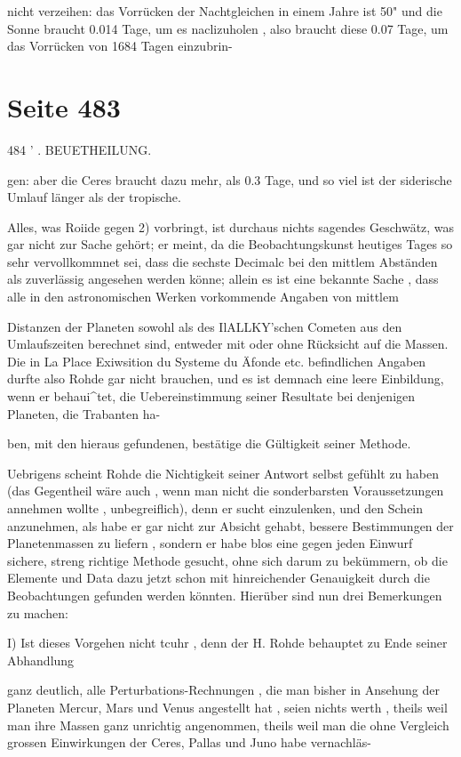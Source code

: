 \documentclass[10pt,a4paper]{article}
\begin{document}
nicht verzeihen: das Vorrücken der Nachtgleichen in einem Jahre ist 50" und die Sonne braucht 0.014 Tage, um es naclizuholen , also braucht diese 0.07 Tage, um das Vorrücken von 1684 Tagen einzubrin-


\newpage
\section*{Seite 483}
484 ' . BEUETHEILUNG.

gen: aber die Ceres braucht dazu mehr, als 0.3 Tage, und so viel ist der siderische Umlauf länger als der tropische.

Alles, was Roiide gegen 2) vorbringt, ist durchaus nichts sagendes Geschwätz, was gar nicht zur Sache gehört; er meint, da die Beobachtungskunst heutiges Tages so sehr vervollkommnet sei, dass die sechste Decimalc bei den mittlem Abständen als zuverlässig angesehen werden könne; allein es ist eine bekannte Sache , dass alle in den astronomischen Werken vorkommende Angaben von mittlem

Distanzen der Planeten sowohl als des IlALLKY'schen Cometen aus den Umlaufszeiten berechnet sind, entweder mit oder ohne Rücksicht auf die Massen. Die in La Place Exiwsition du Systeme du Äfonde etc. befindlichen Angaben durfte also Rohde gar nicht brauchen, und es ist demnach eine leere Einbildung, wenn er behaui\textasciicircum{}tet, die Uebereinstimmung seiner Resultate bei denjenigen Planeten, die Trabanten ha-

ben, mit den hieraus gefundenen, bestätige die Gültigkeit seiner Methode.

Uebrigens scheint Rohde die Nichtigkeit seiner Antwort selbst gefühlt zu haben (das Gegentheil wäre auch , wenn man nicht die sonderbarsten Voraussetzungen annehmen wollte , unbegreiflich), denn er sucht einzulenken, und den Schein anzunehmen, als habe er gar nicht zur Absicht gehabt, bessere Bestimmungen der Planetenmassen zu liefern , sondern er habe blos eine gegen jeden Einwurf sichere, streng richtige Methode gesucht, ohne sich darum zu bekümmern, ob die Elemente und Data dazu jetzt schon mit hinreichender Genauigkeit durch die Beobachtungen gefunden werden könnten. Hierüber sind nun drei Bemerkungen zu machen:

I) Ist dieses Vorgehen nicht tcuhr , denn der H. Rohde behauptet zu Ende seiner Abhandlung

ganz deutlich, alle Perturbations-Rechnungen , die man bisher in Ansehung der Planeten Mercur, Mars und Venus angestellt hat , seien nichts werth , theils weil man ihre Massen ganz unrichtig angenommen, theils weil man die ohne Vergleich grossen Einwirkungen der Ceres, Pallas und Juno habe vernachläs-
\end{document}
